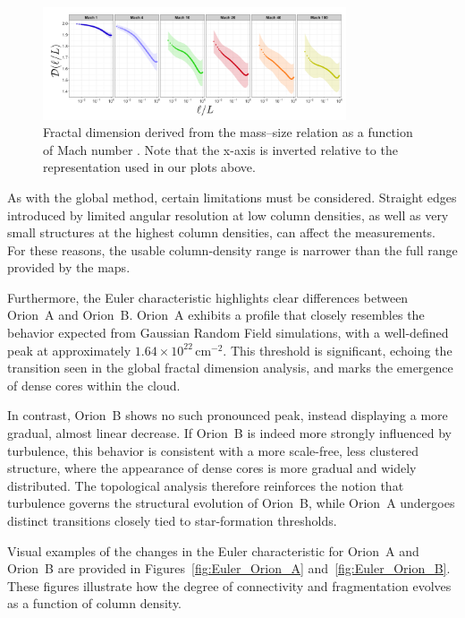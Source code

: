 \begin{figure}[t]
    \centering
    \includegraphics[width=0.8\textwidth]{figures/beattie_fractal_dimension.png}
    \caption{Fractal dimension derived from the mass–size relation as a function of Mach number \cite{beattie2019relation}.  
    Note that the x-axis is inverted relative to the representation used in our plots above.}
    \label{fig:beattie_fractal_dimension}
\end{figure}

As with the global method, certain limitations must be considered.  
Straight edges introduced by limited angular resolution at low column densities, as well as very small structures at the highest column densities, can affect the measurements.  
For these reasons, the usable column‑density range is narrower than the full range provided by the maps.

Furthermore, the Euler characteristic highlights clear differences between Orion~A and Orion~B.  
Orion~A exhibits a profile that closely resembles the behavior expected from Gaussian Random Field simulations, with a well-defined peak at approximately \(1.64 \times 10^{22}\,\mathrm{cm}^{-2}\).  
This threshold is significant, echoing the transition seen in the global fractal dimension analysis, and marks the emergence of dense cores within the cloud.

In contrast, Orion~B shows no such pronounced peak, instead displaying a more gradual, almost linear decrease.  
If Orion~B is indeed more strongly influenced by turbulence, this behavior is consistent with a more scale-free, less clustered structure, where the appearance of dense cores is more gradual and widely distributed.  
The topological analysis therefore reinforces the notion that turbulence governs the structural evolution of Orion~B, while Orion~A undergoes distinct transitions closely tied to star-formation thresholds.

Visual examples of the changes in the Euler characteristic for Orion~A and Orion~B are provided in Figures~\ref{fig:Euler_Orion_A} and~\ref{fig:Euler_Orion_B}.  
These figures illustrate how the degree of connectivity and fragmentation evolves as a function of column density.  

